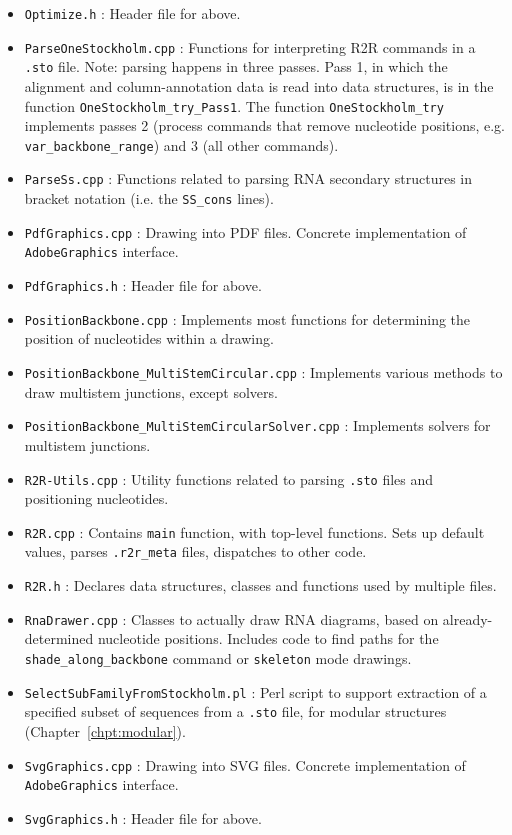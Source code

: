 \documentclass[letterpaper,12pt]{report}
\begin{document}
\begin{itemize}
\item {\tt Optimize.h} : Header file for above.
\item {\tt ParseOneStockholm.cpp} : Functions for interpreting R2R commands in a {\tt .sto} file.  Note: parsing happens in three passes.  Pass 1, in which the alignment and column-annotation data is read into data structures, is in the function {\tt OneStockholm\_try\_Pass1}.  The function {\tt OneStockholm\_try} implements passes 2 (process commands that remove nucleotide positions, e.g. {\tt var\_backbone\_range}) and 3 (all other commands).
\item {\tt ParseSs.cpp} : Functions related to parsing RNA secondary structures in bracket notation (i.e. the {\tt SS\_cons} lines).
\item {\tt PdfGraphics.cpp} : Drawing into PDF files.  Concrete implementation of {\tt AdobeGraphics} interface.
\item {\tt PdfGraphics.h} : Header file for above.
\item {\tt PositionBackbone.cpp} : Implements most functions for determining the position of nucleotides within a drawing.
\item {\tt PositionBackbone\_MultiStemCircular.cpp} : Implements various methods to draw multistem junctions, except solvers.
\item {\tt PositionBackbone\_MultiStemCircularSolver.cpp} : Implements solvers for multistem junctions.
\item {\tt R2R-Utils.cpp} : Utility functions related to parsing {\tt .sto} files and positioning nucleotides.
\item {\tt R2R.cpp} : Contains {\tt main} function, with top-level functions.  Sets up default values, parses {\tt .r2r\_meta} files, dispatches to other code.
\item {\tt R2R.h} : Declares data structures, classes and functions used by multiple files.
\item {\tt RnaDrawer.cpp} : Classes to actually draw RNA diagrams, based on already-determined nucleotide positions.
Includes code to find paths for the {\tt shade\_along\_backbone} command or {\tt skeleton} mode drawings.
\item {\tt SelectSubFamilyFromStockholm.pl} : Perl script to support extraction of a specified subset of sequences from a {\tt .sto} file, for modular structures (Chapter~\ref{chpt:modular}).
\item {\tt SvgGraphics.cpp} : Drawing into SVG files.  Concrete implementation of {\tt AdobeGraphics} interface.
\item {\tt SvgGraphics.h} : Header file for above.

\end{itemize}
\end{document}
